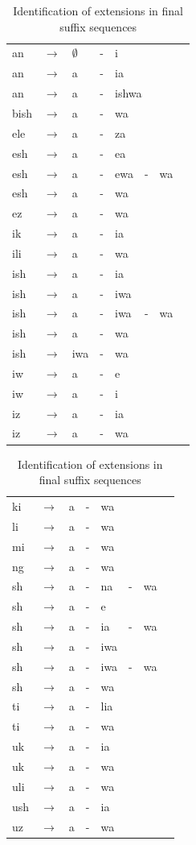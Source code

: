 \documentclass[output=paper,colorlinks,citecolor=brown,
]{langscibook}
\begin{document}
 
\begin{table}
\lsptoprule
\begin{minipage}[b]{.5\linewidth}
\begin{tabular}{llllllll}
an & $\to$ &$\emptyset$ &-& i \\
an & $\to$ & a&-& ia  \\
an & $\to$ & a&-& \multicolumn{2}{l}{ishwa}  \\
bish & $\to$ &  a&-& wa \\
ele  & $\to$ &a&-& za \\
esh  & $\to$ &a&-& ea \\
esh  & $\to$ &a &-& ewa &-& wa \\
esh  & $\to$ &a&-& wa  \\
ez  & $\to$ &a&-& wa \\
ik  & $\to$ &a&-& ia  \\
ili  & $\to$ &a &-&wa \\
ish   & $\to$ &a &-&ia  \\
ish  & $\to$ &a &-&iwa  \\
ish  & $\to$ &a &-&iwa &-&wa \\
ish  & $\to$ &a &-&wa \\
ish  & $\to$ &iwa&-& wa \\	
iw  & $\to$ &a &-&e \\
iw  & $\to$ & a &-&i  \\
iz  & $\to$ &a &-&ia  \\
iz  & $\to$ &a  &-&   wa \\
\end{tabular}
 \end{minipage}
\begin{minipage}[b]{.4\linewidth}
\begin{tabular}{llllllll}
ki  & $\to$ &a  &-&   wa  \\
li  & $\to$ &a  &-&   wa \\
mi  & $\to$ &a   &-&  wa \\
ng  & $\to$ &a  &-&   wa  \\
sh  & $\to$ &a  &-&   na &-&  wa  \\
sh  & $\to$ &a  &-&   e  \\
sh  & $\to$ &a   &-&  ia  &-& wa \\
sh  & $\to$ &a   &-&  iwa \\
sh  & $\to$ &a   &-&  iwa &-&  wa  \\	
sh  & $\to$ &a  &-&   wa \\
ti  & $\to$ &a  &-&   lia \\
ti  & $\to$ &a  &-&   wa \\
uk  & $\to$ &a  &-&   ia \\
uk & $\to$ &a  &-&   wa \\
uli  & $\to$ &a &-&    wa \\
ush  & $\to$ &a  &-&  ia \\
uz  & $\to$ &a  &-&   wa \\
\end{tabular}
 \end{minipage}
 \lspbottomrule
\caption{Identification of extensions in final suffix sequences}
 \label{finalstructure}
\end{table}
\end{document}
